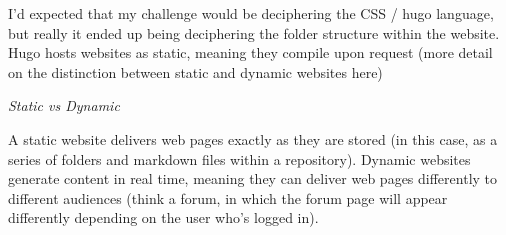 \documentclass[
  letterpaper,
  DIV=11,
  numbers=noendperiod,
  oneside]{scrartcl}
\begin{document}
I'd expected that my challenge would be deciphering the CSS / hugo
language, but really it ended up being deciphering the folder structure
within the website. Hugo hosts websites as static, meaning they compile
upon request (more detail on the distinction between static and dynamic
websites here)

\emph{Static vs Dynamic}

A static website delivers web pages exactly as they are stored (in this
case, as a series of folders and markdown files within a repository).
Dynamic websites generate content in real time, meaning they can deliver
web pages differently to different audiences (think a forum, in which
the forum page will appear differently depending on the user who's
logged in).
\end{document}
